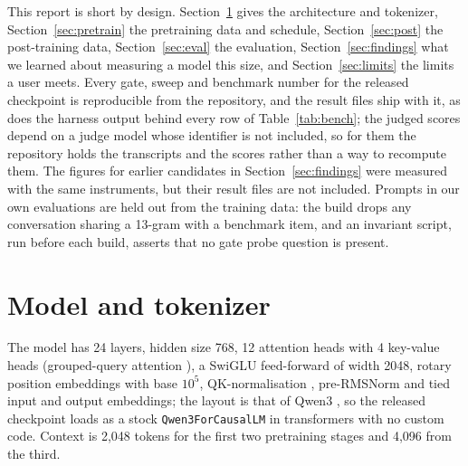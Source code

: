 \documentclass[11pt]{article}
\begin{document}
This report is short by design. Section~\ref{sec:model} gives the architecture and tokenizer, Section~\ref{sec:pretrain} the pretraining data and schedule, Section~\ref{sec:post} the post-training data, Section~\ref{sec:eval} the evaluation, Section~\ref{sec:findings} what we learned about measuring a model this size, and Section~\ref{sec:limits} the limits a user meets. Every gate, sweep and benchmark number for the released checkpoint is reproducible from the repository, and the result files ship with it, as does the harness output behind every row of Table~\ref{tab:bench}; the judged scores depend on a judge model whose identifier is not included, so for them the repository holds the transcripts and the scores rather than a way to recompute them. The figures for earlier candidates in Section~\ref{sec:findings} were measured with the same instruments, but their result files are not included. Prompts in our own evaluations are held out from the training data: the build drops any conversation sharing a 13-gram with a benchmark item, and an invariant script, run before each build, asserts that no gate probe question is present.

\section{Model and tokenizer}\label{sec:model}
The model has 24 layers, hidden size 768, 12 attention heads with 4 key-value heads (grouped-query attention \cite{gqa}), a SwiGLU feed-forward \cite{swiglu} of width 2048, rotary position embeddings \cite{rope} with base $10^5$, QK-normalisation \cite{qknorm}, pre-RMSNorm \cite{rmsnorm} and tied input and output embeddings; the layout is that of Qwen3 \cite{qwen3}, so the released checkpoint loads as a stock \texttt{Qwen3ForCausalLM} in transformers \cite{transformers} with no custom code. Context is 2,048 tokens for the first two pretraining stages and 4,096 from the third.
\end{document}
